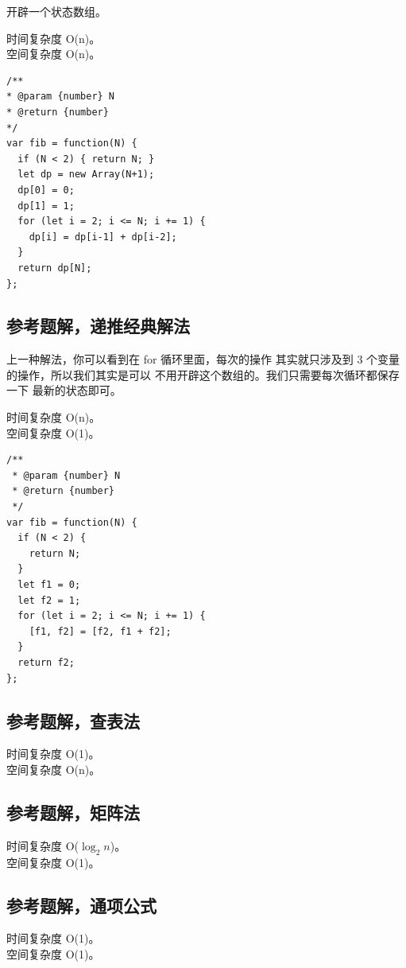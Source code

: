 开辟一个状态数组。

时间复杂度 O(n)。\\
空间复杂度 O(n)。

\begin{verbatim}
/**
* @param {number} N
* @return {number}
*/
var fib = function(N) {
  if (N < 2) { return N; }
  let dp = new Array(N+1);
  dp[0] = 0;
  dp[1] = 1;
  for (let i = 2; i <= N; i += 1) {
    dp[i] = dp[i-1] + dp[i-2];
  }
  return dp[N];
};
\end{verbatim}

\subsection{参考题解，递推经典解法}

上一种解法，你可以看到在 for 循环里面，每次的操作
其实就只涉及到 3 个变量的操作，所以我们其实是可以
不用开辟这个数组的。我们只需要每次循环都保存一下
最新的状态即可。

时间复杂度 O(n)。\\
空间复杂度 O(1)。

\begin{verbatim}
/**
 * @param {number} N
 * @return {number}
 */
var fib = function(N) {
  if (N < 2) {
    return N;
  }
  let f1 = 0;
  let f2 = 1;
  for (let i = 2; i <= N; i += 1) {
    [f1, f2] = [f2, f1 + f2];
  }
  return f2;
};
\end{verbatim}

\subsection{参考题解，查表法}

时间复杂度 O(1)。\\
空间复杂度 O(n)。

\subsection{参考题解，矩阵法}

时间复杂度 O(${\log}_2 n$)。\\
空间复杂度 O(1)。

\subsection{参考题解，通项公式}

时间复杂度 O(1)。\\
空间复杂度 O(1)。

